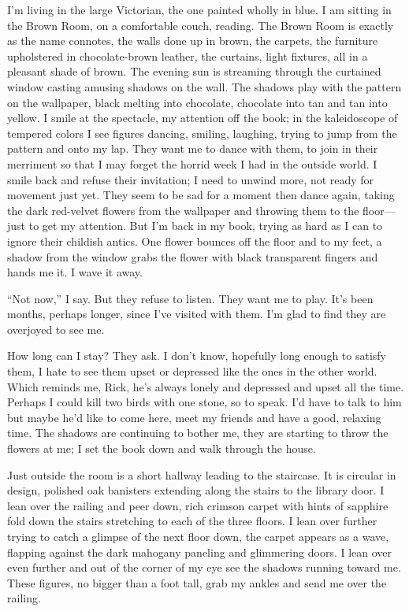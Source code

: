 I'm living in the large Victorian, the one painted wholly in blue. I am
sitting in the Brown Room, on a comfortable couch, reading. The Brown
Room is exactly as the name connotes, the walls done up in brown, the
carpets, the furniture upholstered in chocolate-brown leather, the
curtains, light fixtures, all in a pleasant shade of brown. The evening
sun is streaming through the curtained window casting amusing shadows on
the wall. The shadows play with the pattern on the wallpaper, black
melting into chocolate, chocolate into tan and tan into yellow. I smile
at the spectacle, my attention off the book; in the kaleidoscope of
tempered colors I see figures dancing, smiling, laughing, trying to jump
from the pattern and onto my lap. They want me to dance with them, to
join in their merriment so that I may forget the horrid week I had in
the outside world. I smile back and refuse their invitation; I need to
unwind more, not ready for movement just yet. They seem to be sad for a
moment then dance again, taking the dark red-velvet flowers from the
wallpaper and throwing them to the floor---just to get my attention. But
I'm back in my book, trying as hard as I can to ignore their childish
antics. One flower bounces off the floor and to my feet, a shadow from
the window grabs the flower with black transparent fingers and hands me
it. I wave it away.

``Not now,'' I say. But they refuse to listen. They want me to play.
It's been months, perhaps longer, since I've visited with them. I'm glad
to find they are overjoyed to see me.

How long can I stay? They ask. I don't know, hopefully long enough to
satisfy them, I hate to see them upset or depressed like the ones in the
other world. Which reminds me, Rick, he's always lonely and depressed
and upset all the time. Perhaps I could kill two birds with one stone,
so to speak. I'd have to talk to him but maybe he'd like to come here,
meet my friends and have a good, relaxing time. The shadows are
continuing to bother me, they are starting to throw the flowers at me; I
set the book down and walk through the house.

Just outside the room is a short hallway leading to the staircase. It is
circular in design, polished oak banisters extending along the stairs to
the library door. I lean over the railing and peer down, rich crimson
carpet with hints of sapphire fold down the stairs stretching to each of
the three floors. I lean over further trying to catch a glimpse of the
next floor down, the carpet appears as a wave, flapping against the dark
mahogany paneling and glimmering doors. I lean over even further and out
of the corner of my eye see the shadows running toward me. These
figures, no bigger than a foot tall, grab my ankles and send me over the
railing.

